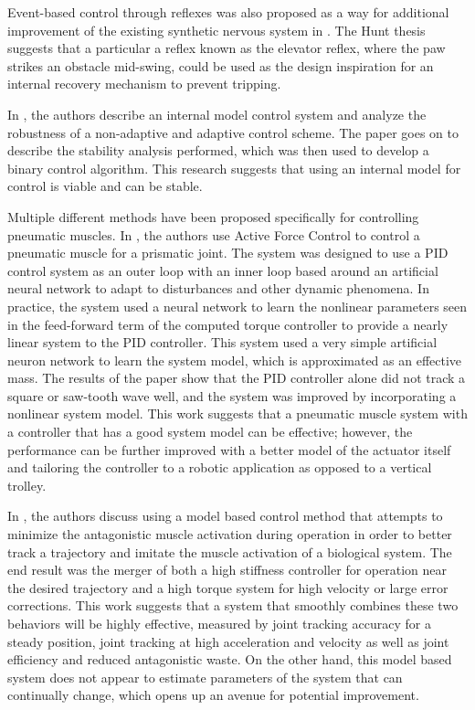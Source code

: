 Event-based control through reflexes was also proposed as a way for additional
improvement of the existing synthetic nervous system in \cite{HuntPhDThesis}.
The Hunt thesis \cite{HuntPhDThesis} suggests that a particular a reflex known as the elevator reflex,
where the paw strikes an
obstacle mid-swing, could be used as the design inspiration for an internal recovery
mechanism to prevent tripping.


In \cite{InternalModel}, the authors describe an internal model control system and analyze the robustness of a non-adaptive and adaptive control scheme. The paper goes on to describe the stability analysis performed, which was then used to develop a binary control algorithm. This research suggests that using an internal model for control is viable and can be stable.


Multiple different methods have been proposed specifically for controlling pneumatic muscles. In \cite{Jahanabadi2009}, the authors use Active Force Control
to control a pneumatic muscle for a prismatic joint. The system was designed to
use a PID control system as an outer loop with an inner loop based around an
artificial neural network to adapt to disturbances and other dynamic phenomena.
In practice, the system used a neural network to learn the nonlinear parameters
seen in the feed-forward term of the computed torque controller to provide a
nearly linear system to the PID controller. This system used a very simple
artificial neuron network to learn the system model, which is approximated as an
effective mass. The results of the paper show that the PID controller alone did
not track a square or saw-tooth wave well, and the system was improved by
incorporating a nonlinear system model. This work suggests that a pneumatic 
muscle system with a controller that has a good system model can be effective; however, the performance can be further improved with a better model of the
actuator itself and tailoring the controller to a robotic application as opposed
to a vertical trolley.

In \cite{Wang2013}, the authors discuss using a model based control method that
attempts to minimize the antagonistic muscle activation during operation in
order to better track a trajectory and imitate the muscle activation of a
biological system. The end result was the merger of both a high stiffness 
controller for operation near the desired trajectory and a high torque system
for high velocity or large error corrections. This work suggests that a system 
that smoothly combines these two behaviors will be highly effective, measured by
joint tracking accuracy for a steady position, joint tracking at high 
acceleration and velocity as well as joint efficiency and reduced antagonistic
waste. On the other hand, this model based system does not appear to estimate
parameters of the system that can continually change, which opens up an avenue
for potential improvement.

